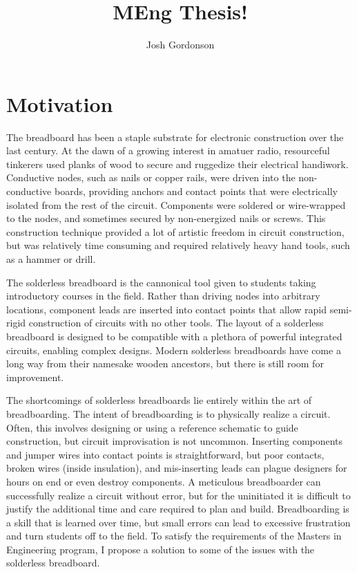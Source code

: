 \documentclass[11pt, a4paper]{article}
\title{MEng Thesis!}
\author{Josh Gordonson}
\begin{document}
\maketitle

\section{Motivation}
The breadboard has been a staple substrate for electronic construction over the last century.
At the dawn of a growing interest in amatuer radio, resourceful tinkerers used planks of wood to secure and ruggedize their electrical handiwork.
Conductive nodes, such as nails or copper rails, were driven into the non-conductive boards, providing anchors and contact points that were electrically isolated from the rest of the circuit.
Components were soldered or wire-wrapped to the nodes, and sometimes secured by non-energized nails or screws.
This construction technique provided a lot of artistic freedom in circuit construction, but was relatively time consuming and required relatively heavy hand tools, such as a hammer or drill.

The solderless breadboard is the cannonical tool given to students taking introductory courses in the field.
Rather than driving nodes into arbitrary locations, component leads are inserted into contact points that allow rapid semi-rigid construction of circuits with no other tools.
The layout of a solderless breadboard is designed to be compatible with a plethora of powerful integrated circuits, enabling complex designs.
Modern solderless breadboards have come a long way from their namesake wooden ancestors, but there is still room for improvement. 

The shortcomings of solderless breadboards lie entirely within the art of breadboarding.
The intent of breadboarding is to physically realize a circuit.
Often, this involves designing or using a reference schematic to guide construction, but circuit improvisation is not uncommon.
Inserting components and jumper wires into contact points is straightforward, but poor contacts, broken wires (inside insulation), and mis-inserting leads can plague designers for hours on end or even destroy components.
A meticulous breadboarder can successfully realize a circuit without error, but for the uninitiated it is difficult to justify the additional time and care required to plan and build.
Breadboarding is a skill that is learned over time, but small errors can lead to excessive frustration and turn students off to the field.
To satisfy the requirements of the Masters in Engineering program, I propose a solution to some of the issues with the solderless breadboard.
\end{document}

